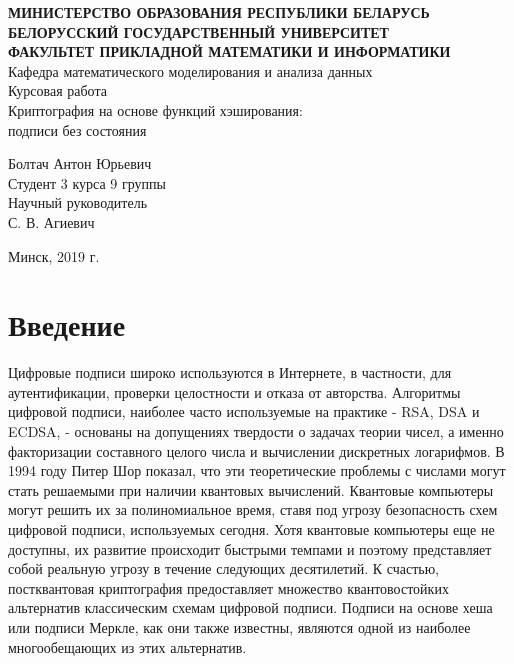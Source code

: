 \documentclass[a4paper, 14pt]{extarticle}
\begin{document}

\begin{center}
    \normalsize{\textbf{МИНИСТЕРСТВО ОБРАЗОВАНИЯ РЕСПУБЛИКИ БЕЛАРУСЬ}}\\
    \hfill \break
    \normalsize{\textbf{БЕЛОРУССКИЙ ГОСУДАРСТВЕННЫЙ УНИВЕРСИТЕТ}}\\
    \hfill \break
    \small{\textbf{ФАКУЛЬТЕТ ПРИКЛАДНОЙ МАТЕМАТИКИ И ИНФОРМАТИКИ}}\\
    \hfill \break
    \large{Кафедра математического моделирования и анализа данных}\\
    \vspace{40mm}
    \normalsize{Курсовая работа}\\
    \hfill \break
    \normalsize{Криптография на основе функций хэширования:\\ подписи без состояния}\\
    \hfill \break
\end{center}

\begin{flushright}
    \vspace{20mm}
    Болтач Антон Юрьевич\\
    Студент 3 курса 9 группы\\
    Научный руководитель\\
    С. В. Агиевич\\
\end{flushright}

\vfill
\begin{center}
    Минск, 2019 г.
\end{center}
\thispagestyle{empty} %
    

\newpage

\tableofcontents
\newpage

\section{Введение}
Цифровые подписи широко используются в Интернете, в частности, для аутентификации, проверки целостности и отказа от авторства. Алгоритмы цифровой подписи, наиболее часто используемые на практике - RSA, DSA и ECDSA, - основаны на допущениях твердости о задачах теории чисел, а именно факторизации составного целого числа и вычислении дискретных логарифмов. В 1994 году Питер Шор показал, что эти теоретические проблемы с числами могут стать решаемыми при наличии квантовых вычислений. Квантовые компьютеры могут решить их за полиномиальное время, ставя под угрозу безопасность схем цифровой подписи, используемых сегодня. Хотя квантовые компьютеры еще не доступны, их развитие происходит быстрыми темпами и поэтому представляет собой реальную угрозу в течение следующих десятилетий. К счастью, постквантовая криптография предоставляет множество квантовостойких альтернатив классическим схемам цифровой подписи. Подписи на основе хеша или подписи Меркле, как они также известны, являются одной из наиболее многообещающих из этих альтернатив.
\end{document}
